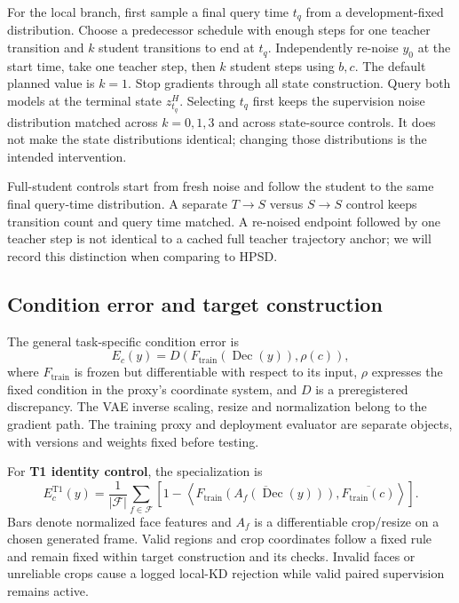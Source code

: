 \documentclass{article}
\begin{document}
For the local branch, first sample a final query time $t_q$ from a development-fixed distribution. Choose a predecessor schedule with enough steps for one teacher transition and $k$ student transitions to end at $t_q$. Independently re-noise $y_0$ at the start time, take one teacher step, then $k$ student steps using $b,c$. The default planned value is $k=1$. Stop gradients through all state construction. Query both models at the terminal state $z_{t_q}^{H}$. Selecting $t_q$ first keeps the supervision noise distribution matched across $k=0,1,3$ and across state-source controls. It does not make the state distributions identical; changing those distributions is the intended intervention.

Full-student controls start from fresh noise and follow the student to the same final query-time distribution. A separate $T\!\to\!S$ versus $S\!\to\!S$ control keeps transition count and query time matched. A re-noised endpoint followed by one teacher step is not identical to a cached full teacher trajectory anchor; we will record this distinction when comparing to HPSD.

\subsection{Condition error and target construction}
The general task-specific condition error is
\begin{equation}
 E_c(y)=D\!\left(F_{\mathrm{train}}(\operatorname{Dec}(y)),\rho(c)\right),
 \label{eq:general_condition}
\end{equation}
where $F_{\mathrm{train}}$ is frozen but differentiable with respect to its input, $\rho$ expresses the fixed condition in the proxy's coordinate system, and $D$ is a preregistered discrepancy. The VAE inverse scaling, resize and normalization belong to the gradient path. The training proxy and deployment evaluator are separate objects, with versions and weights fixed before testing.

For \textbf{T1 identity control}, the specialization is
\begin{equation}
 E_c^{\mathrm{T1}}(y)=\frac{1}{|\mathcal F|}\sum_{f\in\mathcal F}
 \left[1-\left\langle \overline{F_{\mathrm{train}}(A_f(\operatorname{Dec}(y)))},
 \overline{F_{\mathrm{train}}(c)}\right\rangle\right].
\end{equation}
Bars denote normalized face features and $A_f$ is a differentiable crop/resize on a chosen generated frame. Valid regions and crop coordinates follow a fixed rule and remain fixed within target construction and its checks. Invalid faces or unreliable crops cause a logged local-KD rejection while valid paired supervision remains active.
\end{document}
